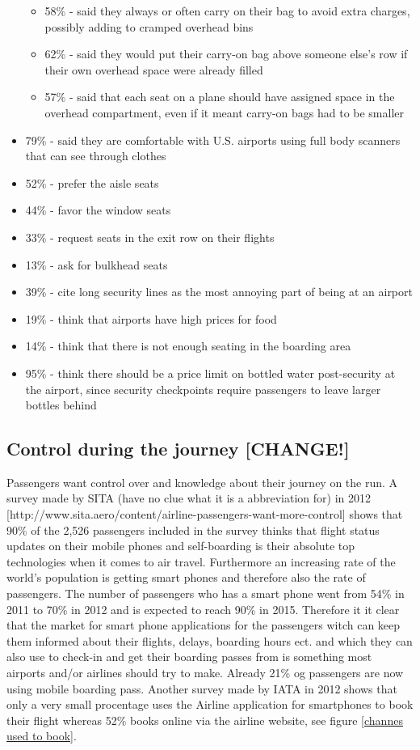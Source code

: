\begin{itemize}
\begin{itemize}
\item 58\% - said they always or often carry on their bag to avoid extra charges, possibly adding to cramped overhead bins
\item 62\% - said they would put their carry-on bag above someone else's row if their own overhead space were already filled
\item 57\% - said that each seat on a plane should have assigned space in the overhead compartment, even if it meant carry-on bags had to be smaller
\end{itemize}
\item 79\% - said they are comfortable with U.S. airports using full body scanners that can see through clothes
\item 52\% - prefer the aisle seats
\item 44\% - favor the window seats
\item 33\% - request seats in the exit row on their flights
\item 13\% - ask for bulkhead seats
\item 39\% - cite long security lines as the most annoying part of being at an airport
\item 19\% - think that airports have high prices for food
\item 14\% - think that there is not enough seating in the boarding area
\item 95\% - think there should be a price limit on bottled water post-security at the airport, since security checkpoints require passengers to leave larger bottles behind
\end{itemize}

\subsection{Control during the journey [CHANGE!]}
Passengers want control over and knowledge about their journey on the run. A survey made by SITA (have no clue what it is a abbreviation for) in 2012 [http://www.sita.aero/content/airline-passengers-want-more-control] shows that 90\% of the 2,526 passengers included in the survey thinks that flight status updates on their mobile phones and self-boarding is their absolute top technologies when it comes to air travel. Furthermore an increasing rate of the world's population is getting smart phones and therefore also the rate of passengers. The number of passengers who has a smart phone went from 54\% in 2011 to 70\% in 2012 and is expected to reach 90\% in 2015. Therefore it it clear that the market for smart phone applications for the passengers witch can keep them informed about their flights, delays, boarding hours ect. and which they can also use to check-in and get their boarding passes from is something most airports and/or airlines should try to make. Already 21\% og passengers are now using mobile boarding pass.
Another survey made by IATA in 2012 shows that only a very small procentage uses the Airline application for smartphones to book their flight whereas 52\% books online via the airline website, see figure \ref{channes used to book}.

